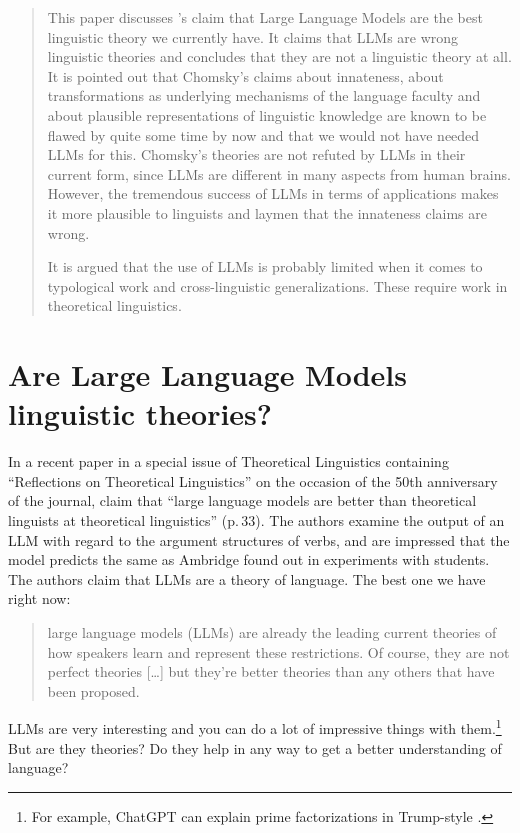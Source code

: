 
\begin{abstract}
This paper discusses \citeauthor{AmbridgeBlything2024a}'s claim \citeyearpar{AmbridgeBlything2024a}
that Large Language Models are the best linguistic theory we currently have. It claims
that LLMs are wrong linguistic theories and concludes that they are not a linguistic theory at
all. It is pointed out that Chomsky's claims about innateness, about transformations as underlying
mechanisms of the language faculty and about plausible representations of linguistic knowledge are
known to be flawed by quite some time by now and that we would not have needed LLMs for
this. Chomsky's theories are not refuted by LLMs in their current form, since LLMs are different in
many aspects from human brains. However, the tremendous success of LLMs in terms of applications
makes it more plausible to linguists and laymen that the innateness claims are wrong. 

It is argued that the use of LLMs is probably limited when it comes to typological work and
cross-linguistic generalizations. These require work in theoretical linguistics.
\end{abstract}

\section{Are Large Language Models linguistic theories?}

In a recent paper in a special issue of Theoretical Linguistics containing ``Reflections on
Theoretical Linguistics'' on the occasion of the 50th anniversary of the journal,
\citet{AmbridgeBlything2024a} claim that ``large language models are better than theoretical
linguists at theoretical linguistics'' (p.\,33). The authors examine the output of an LLM with
regard to the argument structures of verbs, and are impressed that the model predicts the same as
Ambridge found out in experiments with students. The authors claim that LLMs are a theory of
language. The best one we have right now:
\begin{quote}
large language models (LLMs) are already the leading current theories of how speakers learn and
represent these restrictions. Of course, they are not perfect theories [\ldots] but they’re better
theories than any others that have been proposed. \citet[]{AmbridgeBlything2024a}
\end{quote}
LLMs are very interesting and you can do a lot of impressive things with them.\footnote{%
For example, ChatGPT can explain prime factorizations in Trump-style \citep[356--357]{Piantadosi2024a}.
} But are they theories? Do they help in any way to get a better understanding of language?

